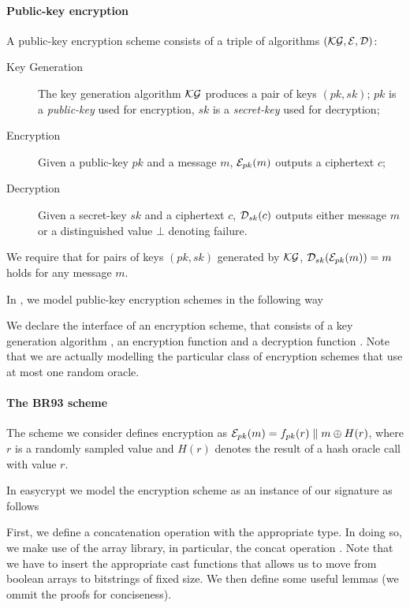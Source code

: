 \paragraph{Public-key encryption}
A public-key encryption scheme consists of a triple of algorithms
$(\mathcal{KG},\mathcal{E},\mathcal{D})$:

\begin{description}
\item[Key Generation] 
  The key generation algorithm $\mathcal{KG}$ produces a pair of keys $(pk,sk)$;
  $pk$ is a \emph{public-key} used for encryption, $sk$ is
  a \emph{secret-key} used for decryption;

\item[Encryption] 
  Given a public-key $pk$ and a message $m$, $\mathcal{E}_{pk}(m)$ outputs a
  ciphertext $c$;

\item[Decryption] 
  Given a secret-key $sk$ and a ciphertext $c$, $\mathcal{D}_{sk}(c)$ outputs
  either message $m$ or a distinguished value $\bot$ denoting failure.
\end{description}
%
We require that for pairs of keys $(pk,sk)$ generated by $\mathcal{KG}$,
$\mathcal{D}_{sk}(\mathcal{E}_{pk}(m))= m$ holds for any message $m$. 

In \EasyCrypt, we model public-key encryption schemes in the following way


We declare the interface of an encryption scheme, that consists of a
key generation algorithm , an encryption function  and
a decryption function . Note that we are actually modelling
the particular class of encryption schemes that use at most one random
oracle.

\paragraph{The BR93 scheme}
The scheme we consider defines encryption as 
$\mathcal{E}_{pk}(m) = f_{pk}(r) \parallel m \oplus H(r)$, where $r$ is a
randomly sampled value and $H(r)$ denotes the result of a hash oracle
call with value $r$.

 In easycrypt we model the encryption scheme as an instance of our
  signature as follows


First, we define a concatenation operation with the appropriate
type. In doing so, we make use of the array library, in particular,
the concat operation \ec{||}. Note that we have to insert the
appropriate cast functions that allows us to move from boolean arrays
to bitstrings of fixed size. We then define some useful lemmas (we
ommit the proofs for conciseness).

